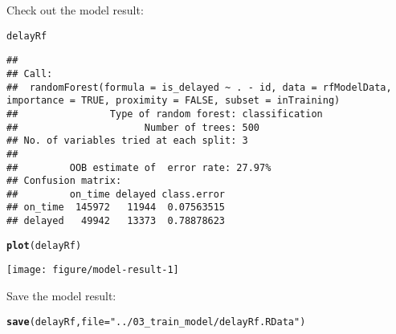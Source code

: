 \documentclass{article}\usepackage[]{graphicx}\usepackage[]{color}
\makeatletter
\def\maxwidth{ %
  \ifdim\Gin@nat@width>\linewidth
    \linewidth
  \else
    \Gin@nat@width
  \fi
}
\newcommand{\hlstr}[1]{\textcolor[rgb]{0.192,0.494,0.8}{#1}}%
\newcommand{\hlstd}[1]{\textcolor[rgb]{0.345,0.345,0.345}{#1}}%
\newcommand{\hlkwc}[1]{\textcolor[rgb]{0.333,0.667,0.333}{#1}}%
\newcommand{\hlkwd}[1]{\textcolor[rgb]{0.737,0.353,0.396}{\textbf{#1}}}%
\newenvironment{kframe}{%
 \def\at@end@of@kframe{}%
 \ifinner\ifhmode%
  \def\at@end@of@kframe{\end{minipage}}%
  \begin{minipage}{\columnwidth}%
 \fi\fi%
 \def\FrameCommand##1{\hskip\@totalleftmargin \hskip-\fboxsep
 \colorbox{shadecolor}{##1}\hskip-\fboxsep
     \hskip-\linewidth \hskip-\@totalleftmargin \hskip\columnwidth}%
 \MakeFramed {\advance\hsize-\width
   \@totalleftmargin\z@ \linewidth\hsize
   \@setminipage}}%
 {\par\unskip\endMakeFramed%
 \at@end@of@kframe}
\newenvironment{knitrout}{}{} %
\makeatother
\begin{document}
Check out the model result:
\begin{knitrout}
\color{fgcolor}\begin{kframe}
\begin{alltt}
\hlstd{delayRf}
\end{alltt}
\begin{verbatim}
## 
## Call:
##  randomForest(formula = is_delayed ~ . - id, data = rfModelData,      importance = TRUE, proximity = FALSE, subset = inTraining) 
##                Type of random forest: classification
##                      Number of trees: 500
## No. of variables tried at each split: 3
## 
##         OOB estimate of  error rate: 27.97%
## Confusion matrix:
##         on_time delayed class.error
## on_time  145972   11944  0.07563515
## delayed   49942   13373  0.78878623
\end{verbatim}
\begin{alltt}
\hlkwd{plot}\hlstd{(delayRf)}
\end{alltt}
\end{kframe}

{\centering \texttt{[image: figure/model-result-1]} 

}



\end{knitrout}

Save the model result:
\begin{knitrout}
\color{fgcolor}\begin{kframe}
\begin{alltt}
\hlkwd{save}\hlstd{(delayRf,} \hlkwc{file}\hlstd{=}\hlstr{"../03_train_model/delayRf.RData"}\hlstd{)}
\end{alltt}
\end{kframe}
\end{knitrout}
\end{document}
